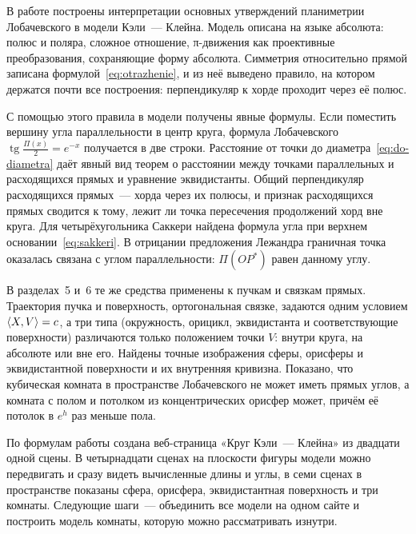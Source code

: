 
В работе построены интерпретации основных утверждений планиметрии Лобачевского в модели Кэли~--- Клейна. Модель описана на языке абсолюта: полюс и поляра, сложное отношение, π-движения как проективные преобразования, сохраняющие форму абсолюта. Симметрия относительно прямой записана формулой~\eqref{eq:otrazhenie}, и из неё выведено правило, на котором держатся почти все построения: перпендикуляр к хорде проходит через её полюс.

С помощью этого правила в модели получены явные формулы. Если поместить вершину угла параллельности в центр круга, формула Лобачевского $\operatorname{tg}\frac{\Pi(x)}2=e^{-x}$ получается в две строки. Расстояние от точки до диаметра~\eqref{eq:do-diametra} даёт явный вид теорем о расстоянии между точками параллельных и расходящихся прямых и уравнение эквидистанты. Общий перпендикуляр расходящихся прямых~--- хорда через их полюсы, и признак расходящихся прямых сводится к тому, лежит ли точка пересечения продолжений хорд вне круга. Для четырёхугольника Саккери найдена формула угла при верхнем основании~\eqref{eq:sakkeri}. В отрицании предложения Лежандра граничная точка оказалась связана с углом параллельности: $\Pi(OP^*)$ равен данному углу.

В разделах~5 и~6 те же средства применены к пучкам и связкам прямых. Траектория пучка и поверхность, ортогональная связке, задаются одним условием $\langle X,V\rangle=c$, а три типа (окружность, орицикл, эквидистанта и соответствующие поверхности) различаются только положением точки $V$: внутри круга, на абсолюте или вне его. Найдены точные изображения сферы, орисферы и эквидистантной поверхности и их внутренняя кривизна. Показано, что кубическая комната в пространстве Лобачевского не может иметь прямых углов, а комната с полом и потолком из концентрических орисфер может, причём её потолок в $e^{h}$ раз меньше пола.

По формулам работы создана веб-страница «Круг Кэли~--- Клейна» из двадцати одной сцены. В четырнадцати сценах на плоскости фигуры модели можно передвигать и сразу видеть вычисленные длины и углы, в семи сценах в пространстве показаны сфера, орисфера, эквидистантная поверхность и три комнаты. Следующие шаги~--- объединить все модели на одном сайте и построить модель комнаты, которую можно рассматривать изнутри.


